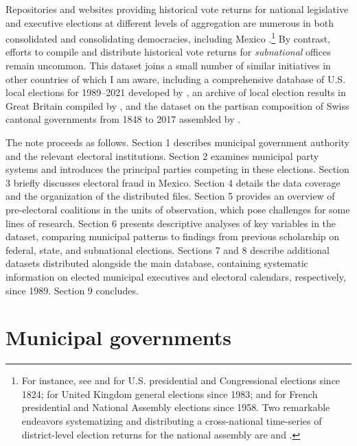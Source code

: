 \documentclass[letter,12pt]{article}
\begin{document}
Repositories and websites providing historical vote returns for national legislative and executive elections at different levels of aggregation are numerous in both consolidated and consolidating democracies, including Mexico \citep{ife.2026}.\footnote{For instance, see \citet{mit.election.data.2017} and \citet{icpsr.us.hist.el.ret.2025} for U.S. presidential and Congressional elections since 1824; \citet{commons.library.uk.els.2023} for United Kingdom general elections since 1983; \citet{interieur.2026} and \citet{gougou.2025} for French presidential and National Assembly elections since 1958. Two remarkable endeavors systematizing and distributing a cross-national time-series of district-level election returns for the national assembly are \citet{lea.2009} and \citet{clea.2024}.} By contrast, efforts to compile and distribute historical vote returns for \emph{subnational} offices remain uncommon. This dataset joins a small number of similar initiatives in other countries of which I am aware, including a comprehensive database of U.S. local elections for 1989--2021 developed by \citet{am-loc-gov-els-database.2023}, an archive of local election results in Great Britain compiled by \citet{teale-loc-els-uk.2026}, and the dataset on the partisan composition of Swiss cantonal governments from 1848 to 2017 assembled by \citet{walter-emmenegger-Party-cantons-2018}. 

The note proceeds as follows. Section 1 describes municipal government authority and the relevant electoral institutions. Section 2 examines municipal party systems and introduces the principal parties competing in these elections. Section 3 briefly discusses electoral fraud in Mexico. Section 4 details the data coverage and the organization of the distributed files. Section 5 provides an overview of pre-electoral coalitions in the units of observation, which pose challenges for some lines of research. Section 6 presents descriptive analyses of key variables in the dataset, comparing municipal patterns to findings from previous scholarship on federal, state, and subnational elections. Sections 7 and 8 describe additional datasets distributed alongside the main database, containing systematic information on elected municipal executives and electoral calendars, respectively, since 1989. Section 9 concludes.

\section{Municipal governments}
\end{document}
